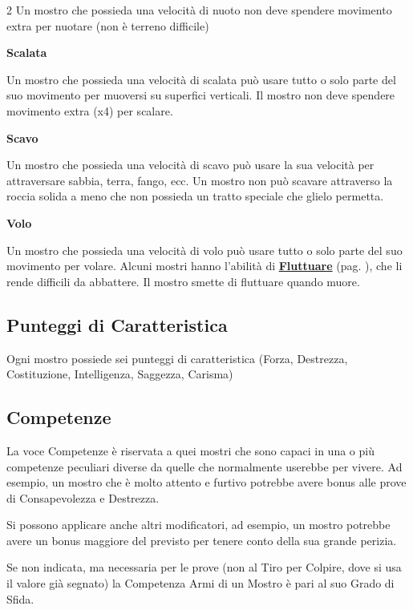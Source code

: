 \begin{multicols}{2}
Un mostro che possieda una velocità di nuoto non deve spendere movimento extra per nuotare (non è terreno difficile)

\smallskip\textbf{Scalata}

Un mostro che possieda una velocità di scalata può usare tutto o solo parte del suo movimento per muoversi su superfici verticali. Il mostro non deve spendere movimento extra (x4) per scalare.

\smallskip\textbf{Scavo}

Un mostro che possieda una velocità di scavo può usare la sua velocità per attraversare sabbia, terra, fango, ecc. Un mostro non può scavare attraverso la roccia solida a meno che non possieda un tratto speciale che glielo permetta.

\smallskip\textbf{Volo}

Un mostro che possieda una velocità di volo può usare tutto o solo parte del suo movimento per volare. Alcuni mostri hanno l'abilità di \hyperlink{Fluttuare}{\textbf{Fluttuare}} (pag. \pageref{Fluttuare}), che li rende difficili da abbattere. Il mostro smette di fluttuare quando muore.

\subsection{Punteggi di Caratteristica}

Ogni mostro possiede sei punteggi di caratteristica (Forza, Destrezza, Costituzione, Intelligenza, Saggezza, Carisma)

\subsection{Competenze}

La voce Competenze è riservata a quei mostri che sono capaci in una o più competenze peculiari diverse da quelle che normalmente userebbe per vivere. Ad esempio, un mostro che è molto attento e furtivo potrebbe avere bonus alle prove di Consapevolezza e Destrezza.

Si possono applicare anche altri modificatori, ad esempio, un mostro potrebbe avere un bonus maggiore del previsto per tenere conto della sua grande perizia.

Se non indicata, ma necessaria per le prove (non al Tiro per Colpire, dove si usa il valore già segnato) la Competenza Armi di un Mostro è pari al suo Grado di Sfida.

\medskip


\end{multicols}
